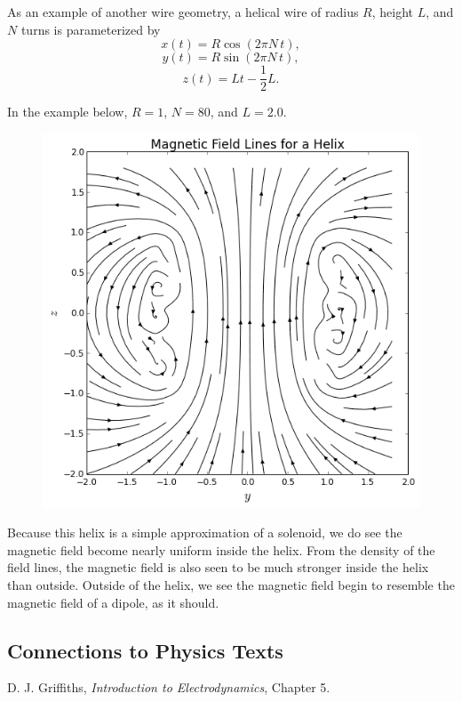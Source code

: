 \documentclass[]{article}
\begin{document}
As an example of another wire geometry, a helical wire of radius \(R\),
height \(L\), and \(N\) turns is parameterized by
\[ x(t) = R \cos\left( 2\pi N\,t \right), \]
\[ y(t) = R \sin\left( 2\pi N\,t \right), \]
\[ z(t) = Lt - \frac{1}{2}L. \]

In the example below, \(R=1\), \(N=80\), and \(L=2.0\).

\begin{figure}[htbp]
\centering
\includegraphics{images/output_26_2.png}
\caption{}
\end{figure}

Because this helix is a simple approximation of a solenoid, we do see
the magnetic field become nearly uniform inside the helix. From the
density of the field lines, the magnetic field is also seen to be much
stronger inside the helix than outside. Outside of the helix, we see the
magnetic field begin to resemble the magnetic field of a dipole, as it
should.

\subsection{Connections to Physics
Texts}\label{connections-to-physics-texts}

D. J. Griffiths, \emph{Introduction to Electrodynamics}, Chapter 5.
\end{document}
